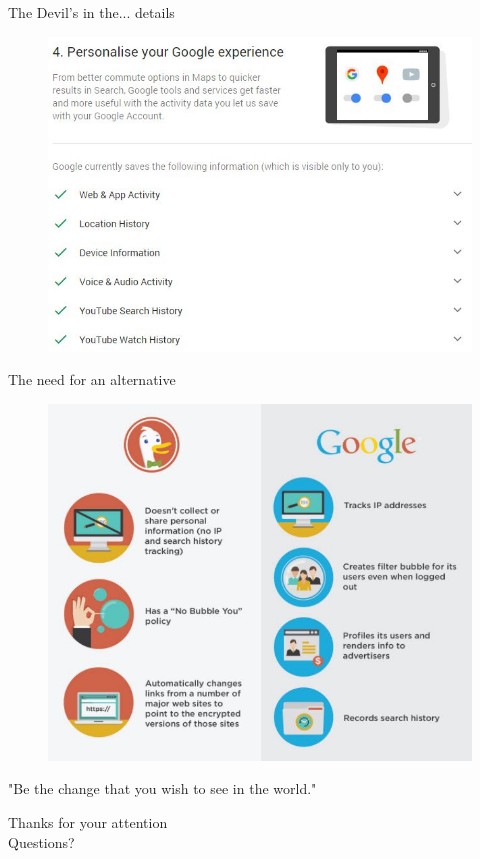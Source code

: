 \documentclass[11pt, british]{beamer}
\begin{document}
		\begin{frame}{The Devil's in the... details}
			\begin{figure}
				\includegraphics[width=\linewidth]{Imgs/google-privacy-checkup.jpg}
			\end{figure}
		\end{frame}
		
		\begin{frame}{The need for an alternative}
			\begin{figure}
				\includegraphics[width=0.9\linewidth]{Imgs/hackernoon.jpeg}
			\end{figure}
		\end{frame}
		
		\begin{frame}[standout]
			\begin{displayquote}
				"Be the change that you wish to see in the world." 
			\end{displayquote}
			Thanks for your attention
			\\
			Questions?
		\end{frame}
	
		\begin{frame}[allowframebreaks]
			\printbibliography
		\end{frame}
	
\end{document}
